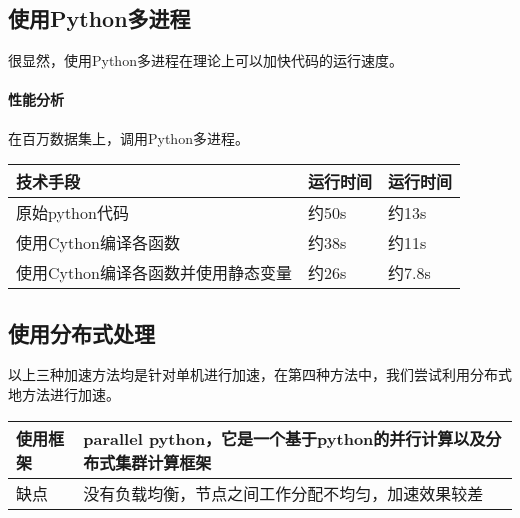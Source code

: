 \subsection{使用Python多进程}
很显然，使用Python多进程在理论上可以加快代码的运行速度。

\paragraph{性能分析}在百万数据集上，调用Python多进程。
\begin{table}[H]
\begin{adjustwidth}{-3cm}{-3cm}
\begin{center}
\begin{tabular}{|p{}| p{}|p{}|} \hline
技术手段 & 运行时间  &运行时间\\ \hline
原始python代码 & 约50s & 约13s \\ \hline
使用Cython编译各函数 & 约38s & 约11s \\ \hline
使用Cython编译各函数并使用静态变量 & 约26s& 约7.8s\\ \hline
\end{tabular}
\end{center}
\end{adjustwidth}
\end{table}

\subsection{使用分布式处理}
以上三种加速方法均是针对单机进行加速，在第四种方法中，我们尝试利用分布式地方法进行加速。
\begin{table}[H]
\begin{adjustwidth}{-3cm}{-3cm}
\begin{center}
\begin{tabular}{|p{}| p{}|} \hline
使用框架 & parallel python，它是一个基于python的并行计算以及分布式集群计算框架  \\ \hline
缺点& 没有负载均衡，节点之间工作分配不均匀，加速效果较差
  \\ \hline
\end{tabular}
\end{center}
\end{adjustwidth}
\end{table}